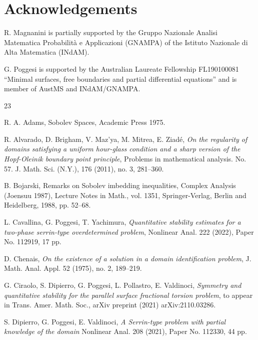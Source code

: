 \documentclass[a4paper,10pt]{amsart}
\numberwithin{equation}{section}
\begin{document}
\section*{Acknowledgements}
R. Magnanini is partially supported by the Gruppo Nazionale Analisi Mate\-matica Probabilit\`a e Applicazioni (GNAMPA) of the Istituto Nazionale di Alta Matema\-ti\-ca (INdAM).

G. Poggesi is supported by the Australian Laureate Fellowship FL190100081
``Minimal surfaces, free boundaries and partial differential equations'' and is member of AustMS and INdAM/GNAMPA.  



\begin{thebibliography}{23}

 R. A. Adams, Sobolev Spaces, Academic Press 1975.

 R. Alvarado, D. Brigham, V. Maz’ya, M. Mitrea, E. Ziad\'e, {\it On the regularity of domains satisfying a uniform hour-glass condition and a sharp version of the Hopf-Oleinik boundary point principle}, Problems in mathematical analysis. No. 57. J.
Math. Sci. (N.Y.), 176 (2011), no. 3, 281--360.

 B. Bojarski, Remarks on Sobolev imbedding inequalities, Complex Analysis (Joensuu 1987),
Lecture Notes in Math., vol. 1351, Springer-Verlag, Berlin and Heidelberg, 1988, pp. 52--68.

 L. Cavallina, G. Poggesi, T. Yachimura, \emph{Quantitative stability estimates for a two-phase serrin-type overdetermined problem}, Nonlinear Anal. 222 (2022), Paper No. 112919, 17 pp.

 D. Chenais, \emph{On the existence of a solution in a domain identification problem}, J. Math. Anal. Appl. 52 (1975), no. 2, 189–219.

 G. Ciraolo, S. Dipierro, G. Poggesi, L. Pollastro, E. Valdinoci, \emph{Symmetry and quantitative stability for the parallel surface fractional torsion problem}, to appear in Trans. Amer. Math. Soc., arXiv preprint (2021) arXiv:2110.03286.

 S. Dipierro, G. Poggesi, E. Valdinoci, \emph{A Serrin-type problem with partial knowledge of the domain} Nonlinear Anal. 208 (2021), Paper No. 112330, 44 pp.




\end{thebibliography}
\end{document}
